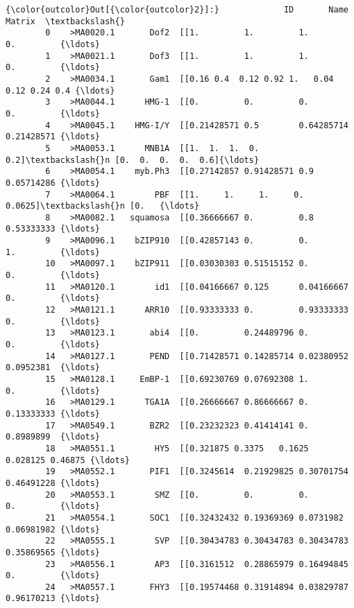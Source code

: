 \documentclass[11pt]{article}
\begin{document}
\begin{Verbatim}[commandchars=\\\{\}]
{\color{outcolor}Out[{\color{outcolor}2}]:}             ID       Name                                             Matrix  \textbackslash{}
        0    >MA0020.1       Dof2  [[1.         1.         1.         0.         {\ldots}   
        1    >MA0021.1       Dof3  [[1.         1.         1.         0.         {\ldots}   
        2    >MA0034.1       Gam1  [[0.16 0.4  0.12 0.92 1.   0.04 0.12 0.24 0.4 {\ldots}   
        3    >MA0044.1      HMG-1  [[0.         0.         0.         0.         {\ldots}   
        4    >MA0045.1    HMG-I/Y  [[0.21428571 0.5        0.64285714 0.21428571 {\ldots}   
        5    >MA0053.1      MNB1A  [[1.  1.  1.  0.  0.2]\textbackslash{}n [0.  0.  0.  0.  0.6]{\ldots}   
        6    >MA0054.1    myb.Ph3  [[0.27142857 0.91428571 0.9        0.05714286 {\ldots}   
        7    >MA0064.1        PBF  [[1.     1.     1.     0.     0.0625]\textbackslash{}n [0.   {\ldots}   
        8    >MA0082.1   squamosa  [[0.36666667 0.         0.8        0.53333333 {\ldots}   
        9    >MA0096.1    bZIP910  [[0.42857143 0.         0.         1.         {\ldots}   
        10   >MA0097.1    bZIP911  [[0.03030303 0.51515152 0.         0.         {\ldots}   
        11   >MA0120.1        id1  [[0.04166667 0.125      0.04166667 0.         {\ldots}   
        12   >MA0121.1      ARR10  [[0.93333333 0.         0.93333333 0.         {\ldots}   
        13   >MA0123.1       abi4  [[0.         0.24489796 0.         0.         {\ldots}   
        14   >MA0127.1       PEND  [[0.71428571 0.14285714 0.02380952 0.0952381  {\ldots}   
        15   >MA0128.1     EmBP-1  [[0.69230769 0.07692308 1.         0.         {\ldots}   
        16   >MA0129.1      TGA1A  [[0.26666667 0.86666667 0.         0.13333333 {\ldots}   
        17   >MA0549.1       BZR2  [[0.23232323 0.41414141 0.         0.8989899  {\ldots}   
        18   >MA0551.1        HY5  [[0.321875 0.3375   0.1625   0.028125 0.46875 {\ldots}   
        19   >MA0552.1       PIF1  [[0.3245614  0.21929825 0.30701754 0.46491228 {\ldots}   
        20   >MA0553.1        SMZ  [[0.         0.         0.         0.         {\ldots}   
        21   >MA0554.1       SOC1  [[0.32432432 0.19369369 0.0731982  0.06981982 {\ldots}   
        22   >MA0555.1        SVP  [[0.30434783 0.30434783 0.30434783 0.35869565 {\ldots}   
        23   >MA0556.1        AP3  [[0.3161512  0.28865979 0.16494845 0.         {\ldots}   
        24   >MA0557.1       FHY3  [[0.19574468 0.31914894 0.03829787 0.96170213 {\ldots}   

\end{Verbatim}
\end{document}
